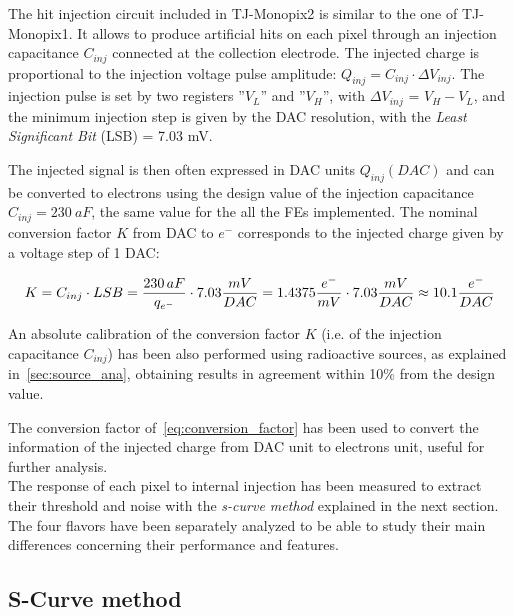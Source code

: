 The hit injection circuit included in TJ-Monopix2 is similar to the one of TJ-Monopix1. 
It allows to produce artificial hits on each pixel through an injection capacitance \textbf{$C_{inj}$} connected at the collection electrode. The injected charge is proportional to the injection voltage pulse amplitude: $Q_{inj} = C_{inj} \cdot \Delta V_{inj}$. The injection pulse is set by two registers ''\textbf{$V_{L}$}'' and ''\textbf{$V_{H}$}'', with $\Delta V_{inj}$ = \textbf{$V_{H}-V_{L}$}, and the minimum injection step is given by the DAC resolution, with the \textit{Least Significant Bit} (LSB) = 7.03 mV. 

The injected signal is then often expressed in DAC units $Q_{inj}(DAC)$ and can be converted to electrons using the design value of the injection capacitance \textbf{$C_{inj}= 230\ aF$}, the same value for the all the FEs implemented.  
The nominal conversion factor $K$ from DAC to $e^{-}$ corresponds to the injected charge given by a voltage step of 1 DAC: 

\begin{equation}
\small
K = C_{inj} \cdot LSB = \frac{230 \, aF}{q_{{e}^{-}}} \cdot 7.03 \frac{mV}{DAC}= 1.4375 \frac{e^{-}}{mV} \cdot 7.03 \frac{mV}{DAC} \approx 10.1 \frac{e^{-}}{DAC}  
\label{eq:conversion_factor}
\end{equation}


An absolute calibration of the conversion factor $K$ (i.e. of the injection capacitance $C_{inj}$) has been also performed using radioactive sources, as explained in~\autoref{sec:source_ana}, obtaining results in agreement within 10$\%$ from the design value. 

The conversion factor of~\autoref{eq:conversion_factor} has been used to convert the information of the injected charge from DAC unit to electrons unit, useful for further analysis.
\\
The response of each pixel to internal injection has been measured to extract their threshold and noise with the \textit{s-curve method} explained in the next section. 
The four flavors have been separately analyzed to be able to study their main differences concerning their performance and features. 


\subsection{S-Curve method} \label{sec:threshold_subsection}

